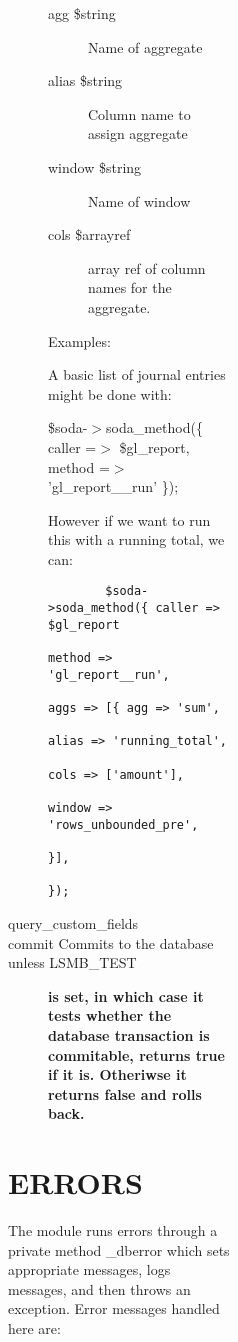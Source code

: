 \begin{description}
\begin{description}
\begin{description}
\begin{description}
\begin{description}
\begin{description}
\begin{description}
\begin{description}
\begin{description}
\item[{agg \$string}] \mbox{}

Name of aggregate


\item[{alias \$string}] \mbox{}

Column name to assign aggregate


\item[{window \$string}] \mbox{}

Name of window


\item[{cols \$arrayref}] \mbox{}

array ref of column names for the aggregate.

\end{description}


Examples:



A basic list of journal entries might be done with:



\$soda-$>$soda\_method(\{ caller =$>$ \$gl\_report, method =$>$ 'gl\_report\_\_run' \});



However if we want to run this with a running total, we can:

\begin{verbatim}
        $soda->soda_method({ caller => $gl_report
                             method => 'gl_report__run',
                               aggs => [{ agg => 'sum',
                                        alias => 'running_total',
                                         cols => ['amount'],
                                       window => 'rows_unbounded_pre',
                                       }],
                          });
\end{verbatim}

\item[{query\_custom\_fields}] \mbox{}
\item[{commit Commits to the database unless LSMB\_TEST}] \textbf{is set, in which case it tests whether the database transaction is commitable, returns true if it is. Otheriwse it returns false and rolls back.}\end{description}
\section{ERRORS\label{ERRORS}}


The module runs errors through a private method \_dberror which sets appropriate
messages, logs messages, and then throws an exception.  Error messages handled
here are:


\end{description}
\end{description}
\end{description}
\end{description}
\end{description}
\end{description}
\end{description}
